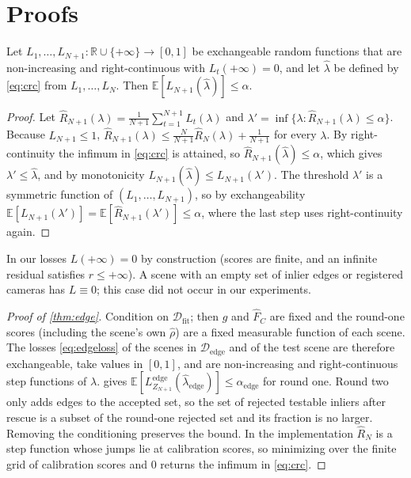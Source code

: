 \section{Proofs}\label{app:proofs}

\begin{lemma}\label{lem:crc}
Let $L_1,\dots,L_{N+1}:\mathbb{R}\cup\{+\infty\}\to[0,1]$ be exchangeable random functions that are non-increasing and right-continuous with $L_t(+\infty)=0$, and let $\hat\lambda$ be defined by \eqref{eq:crc} from $L_1,\dots,L_N$. Then $\mathbb{E}[L_{N+1}(\hat\lambda)]\le\alpha$.
\end{lemma}
\begin{proof}
Let $\hat R_{N+1}(\lambda)=\frac{1}{N+1}\sum_{t=1}^{N+1}L_t(\lambda)$ and $\lambda'=\inf\{\lambda:\hat R_{N+1}(\lambda)\le\alpha\}$. Because $L_{N+1}\le1$, $\hat R_{N+1}(\lambda)\le\frac{N}{N+1}\hat R_N(\lambda)+\frac{1}{N+1}$ for every $\lambda$. By right-continuity the infimum in \eqref{eq:crc} is attained, so $\hat R_{N+1}(\hat\lambda)\le\alpha$, which gives $\lambda'\le\hat\lambda$, and by monotonicity $L_{N+1}(\hat\lambda)\le L_{N+1}(\lambda')$. The threshold $\lambda'$ is a symmetric function of $(L_1,\dots,L_{N+1})$, so by exchangeability $\mathbb{E}[L_{N+1}(\lambda')]=\mathbb{E}[\hat R_{N+1}(\lambda')]\le\alpha$, where the last step uses right-continuity again.
\end{proof}

In our losses $L(+\infty)=0$ by construction (scores are finite, and an infinite residual satisfies $r\le+\infty$). A scene with an empty set of inlier edges or registered cameras has $L\equiv0$; this case did not occur in our experiments.

\begin{proof}[Proof of \cref{thm:edge}]
Condition on $\mathcal{D}_{\mathrm{fit}}$; then $g$ and $\hat F_C$ are fixed and the round-one scores (including the scene's own $\hat\rho$) are a fixed measurable function of each scene. The losses \eqref{eq:edgeloss} of the scenes in $\mathcal{D}_{\mathrm{edge}}$ and of the test scene are therefore exchangeable, take values in $[0,1]$, and are non-increasing and right-continuous step functions of $\lambda$.  gives $\mathbb{E}[L^{\mathrm{edge}}_{Z_{N+1}}(\hat\lambda_{\mathrm{edge}})]\le\alpha_{\mathrm{edge}}$ for round one. Round two only adds edges to the accepted set, so the set of rejected testable inliers after rescue is a subset of the round-one rejected set and its fraction is no larger. Removing the conditioning preserves the bound. In the implementation $\hat R_N$ is a step function whose jumps lie at calibration scores, so minimizing over the finite grid of calibration scores and $0$ returns the infimum in \eqref{eq:crc}.
\end{proof}

